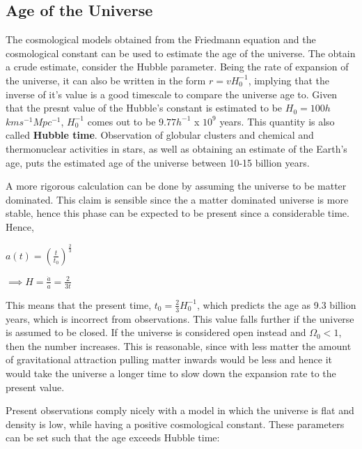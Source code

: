 
\subsection{Age of the Universe}
The cosmological models obtained from the Friedmann equation and the cosmological constant can be used to estimate the age of the universe. The obtain a crude estimate, consider the Hubble parameter. Being the rate of expansion of the universe, it can also be written in the form $r = v H_0^{-1}$, implying that the inverse of it's value is a good timescale to compare the universe age to. Given that the presnt value of the Hubble's constant is estimated to be $H_0 = 100h$ $km s^{-1} Mpc^{-1}$, $H_0^{-1}$ comes out to be $9.77h^{-1}$ x $10^9$ years. This quantity is also called \textbf{Hubble time}. Observation of globular clusters and chemical and thermonuclear activities in stars, as well as obtaining an estimate of the Earth's age, puts the estimated age of the universe between 10-15 billion years. 

A more rigorous calculation can be done by assuming the universe to be matter dominated. This claim is sensible since the a matter dominated universe is more stable, hence this phase can be expected to be present since a considerable time. Hence,

\begin{center}
    $a(t) = (\frac{t}{t_0})^{\frac{2}{3}}$
\end{center}

\begin{center}
    $\implies H = \frac{\dot{a}}{a} = \frac{2}{3t}$
\end{center}

This means that the present time, $t_0 = \frac{2}{3}H_0^{-1}$, which predicts the age as 9.3 billion years, which is incorrect from observations. This value falls further if the universe is assumed to be closed. If the universe is considered open instead and $\Omega_{0}<1$, then the number increases. This is reasonable, since with less matter the amount of gravitational attraction pulling matter inwards would be less and hence it would take the universe a longer time to slow down the expansion rate to the present value. 

Present observations comply nicely with a model in which the universe is flat and density is low, while having a positive cosmological constant. These parameters can be set such that the age exceeds Hubble time:

